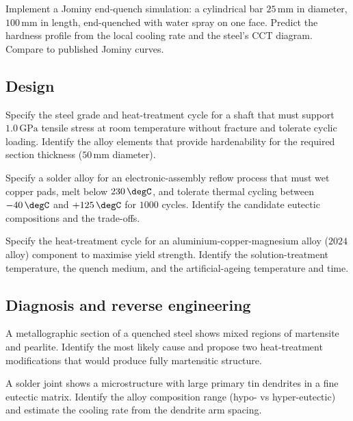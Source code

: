 \begin{exercise}
Implement a Jominy end-quench simulation: a cylindrical bar
$25\,\text{mm}$ in diameter, $100\,\text{mm}$ in length, end-quenched
with water spray on one face. Predict the hardness profile from the
local cooling rate and the steel's CCT diagram. Compare to published
Jominy curves.
\end{exercise}

\subsection*{Design}

\begin{exercise}
Specify the steel grade and heat-treatment cycle for a shaft that
must support $1.0\,\text{GPa}$ tensile stress at room temperature
without fracture and tolerate cyclic loading. Identify the alloy
elements that provide hardenability for the required section
thickness ($50\,\text{mm}$ diameter).
\end{exercise}

\begin{exercise}
Specify a solder alloy for an electronic-assembly reflow process
that must wet copper pads, melt below $230\,\degC$, and tolerate
thermal cycling between $-40\,\degC$ and $+125\,\degC$ for $1000$
cycles. Identify the candidate eutectic compositions and the
trade-offs.
\end{exercise}

\begin{exercise}
Specify the heat-treatment cycle for an aluminium-copper-magnesium
alloy ($2024$ alloy) component to maximise yield strength.
Identify the solution-treatment temperature, the quench medium, and
the artificial-ageing temperature and time.
\end{exercise}

\subsection*{Diagnosis and reverse engineering}

\begin{exercise}
A metallographic section of a quenched steel shows mixed regions of
martensite and pearlite. Identify the most likely cause and propose
two heat-treatment modifications that would produce fully
martensitic structure.
\end{exercise}

\begin{exercise}
A solder joint shows a microstructure with large primary tin
dendrites in a fine eutectic matrix. Identify the alloy composition
range (hypo- vs hyper-eutectic) and estimate the cooling rate from
the dendrite arm spacing.
\end{exercise}

